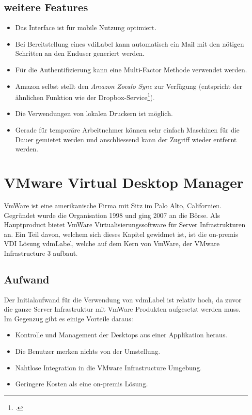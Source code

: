 \subsection{weitere Features}
\begin{itemize}
	\item Das Interface ist für mobile Nutzung optimiert.
	\item Bei Bereitstellung eines \Gls{vdiLabel} kann automatisch ein Mail mit den nötigen Schritten an den Enduser generiert werden.
	\item Für die Authentifizierung kann eine Multi-Factor Methode verwendet werden.
	\item Amazon selbst stellt den \textit{Amazon Zocalo Sync} zur Verfügung (entspricht der ähnlichen Funktion wie der Dropbox-Service\footcite{Dropbox_2014-11-15}).
	\item Die Verwendungen von lokalen Druckern ist möglich.
	\item Gerade für temporäre Arbeitnehmer können sehr einfach Maschinen für die Dauer gemietet werden und anschliessend kann der Zugriff wieder entfernt werden.
\end{itemize}

\section{VMware Virtual Desktop Manager}
VmWare ist eine amerikanische Firma mit Sitz im Palo Alto, Californien. Gegründet wurde die Organisation 1998 und ging 2007 an die Börse.
Als Hauptproduct bietet VmWare Virtualisierungssoftware für Server Infrastrukturen an. Ein Teil davon, welchem sich dieses Kapitel gewidmet ist, ist die on-premis VDI Lösung \Gls{vdmLabel}, welche auf dem Kern von VmWare, der VMware Infrastructure 3 aufbaut.

\subsection{Aufwand}
Der Initialaufwand für die Verwendung von \Gls{vdmLabel} ist relativ hoch, da zuvor die ganze Server Infrastruktur mit VmWare Produkten aufgesetzt werden muss.
Im Gegenzug gibt es einige Vorteile daraus:
\begin{itemize}
	\item Kontrolle und Management der Desktops aus einer Applikation heraus.
	\item Die Benutzer merken nichts von der Umstellung.
	\item Nahtlose Integration in die VMware Infrastructure Umgebung.
	\item Geringere Kosten als eine on-premis Lösung.
\end{itemize}

